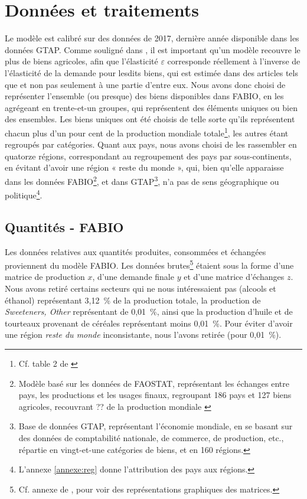 \section{Données et traitements}
Le modèle est calibré sur des données de 2017, dernière année disponible dans les données GTAP. Comme souligné dans \cite{Gouel2021}, il est important qu'un modèle recouvre le plus de biens agricoles, afin que l'élasticité $\varepsilon$ corresponde réellement à l'inverse de l'élasticité de la demande pour lesdits biens, qui est estimée dans des articles tels que \cite{Comin2021} et non pas seulement à une partie d'entre eux. Nous avons donc choisi de représenter l'ensemble (ou presque) des biens disponibles dans FABIO, en les agrégeant en trente-et-un groupes, qui représentent des éléments uniques ou bien des ensembles. Les biens uniques ont été choisis de telle sorte qu'ils représentent chacun plus d'un pour cent de la production mondiale totale\footnote{Cf. table 2 de \cite{Gouel2021}}, les autres étant regroupés par catégories. Quant aux pays, nous avons choisi de les rassembler en quatorze régions, correspondant au regroupement des pays par sous-continents, en évitant d'avoir une région « reste du monde », qui, bien qu'elle apparaisse dans les données FABIO\footnote{Modèle basé sur les données de FAOSTAT, représentant les échanges entre pays, les productions et les usages finaux, regroupant 186 pays et 127 biens agricoles, recouvrant ?? de la production mondiale \cite{Bruckner2019}}, et dans GTAP\footnote{Base de données GTAP, représentant l'économie mondiale, en se basant sur des données de comptabilité nationale, de commerce, de production, etc., répartie en vingt-et-une catégories de biens, et en 160 régions.}, n'a pas de sens géographique ou politique\footnote{L'annexe \ref{annexe:reg} donne l'attribution des pays aux régions.}.


\subsection{Quantités - FABIO}

Les données relatives aux quantités produites, consommées et échangées proviennent du modèle FABIO. Les données brutes\footnote{Cf. annexe de \cite{Bruckner2019}, pour voir des représentations graphiques des matrices.} étaient sous la forme d'une matrice de production $x$, d'une demande finale $y$  et d'une matrice d'échanges $z$. Nous avons retiré certains secteurs qui ne nous intéressaient pas (alcools et éthanol) représentant 3,12~\% de la production totale, la production de \textit{Sweeteners, Other} représentant de 0,01~\%, ainsi que la production d'huile et de tourteaux provenant de céréales représentant moins 0,01~\%. Pour éviter d'avoir une région \textit{reste du monde} inconsistante, nous l'avons retirée (pour 0,01~\%).

